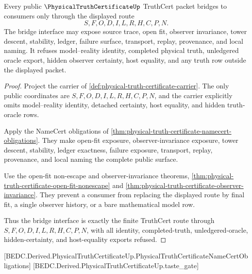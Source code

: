 \begin{theorem}
\label{thm:physical-truth-certificate-bridge-interface}
Every public $\PhysicalTruthCertificateUp$ TruthCert packet bridges to consumers only through the displayed route
$$
S,F,O,D,I,L,R,H,C,P,N .
$$
The bridge interface may expose source trace, open fit, observer invariance, tower descent, stability, ledger, failure surface, transport, replay, provenance, and local naming. It refuses model--reality identity, completed physical truth, unledgered oracle export, hidden observer certainty, host equality, and any truth row outside the displayed packet.
\end{theorem}
\begin{proof}
Project the carrier of \autoref{def:physical-truth-certificate-carrier}. The only public coordinates are $S,F,O,D,I,L,R,H,C,P,N$, and the carrier explicitly omits model--reality identity, detached certainty, host equality, and hidden truth-oracle rows.

Apply the NameCert obligations of \autoref{thm:physical-truth-certificate-namecert-obligations}. They make open-fit exposure, observer-invariance exposure, tower descent, stability, ledger exactness, failure exposure, transport, replay, provenance, and local naming the complete public surface.

Use the open-fit non-escape and observer-invariance theorems, \autoref{thm:physical-truth-certificate-open-fit-nonescape} and \autoref{thm:physical-truth-certificate-observer-invariance}. They prevent a consumer from replacing the displayed route by final fit, a single observer history, or a bare mathematical model row.

Thus the bridge interface is exactly the finite TruthCert route through $S,F,O,D,I,L,R,H,C,P,N$, with all identity, completed-truth, unledgered-oracle, hidden-certainty, and host-equality exports refused.
\end{proof}

[BEDC.Derived.PhysicalTruthCertificateUp.PhysicalTruthCertificateNameCertObligations]
[BEDC.Derived.PhysicalTruthCertificateUp.taste\_gate]

